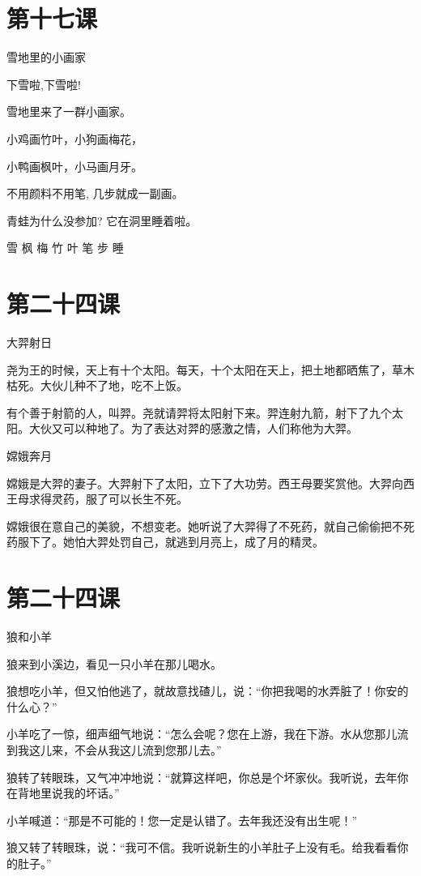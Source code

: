 \documentclass[12pt,UTF8]{ctexbook}
\begin{document}
\section{第十七课}

雪地里的小画家

下雪啦,下雪啦!

雪地里来了一群小画家。

小鸡画竹叶，小狗画梅花，

小鸭画枫叶，小马画月牙。

不用颜料不用笔, 几步就成一副画。

青蛙为什么没参加? 它在洞里睡着啦。

雪 枫 梅 竹 叶 笔 步 睡

\section{第二十四课}

大羿射日

尧为王的时候，天上有十个太阳。每天，十个太阳在天上，把土地都晒焦了，草木枯死。大伙儿种不了地，吃不上饭。

有个善于射箭的人，叫羿。尧就请羿将太阳射下来。羿连射九箭，射下了九个太阳。大伙又可以种地了。为了表达对羿的感激之情，人们称他为大羿。

嫦娥奔月

嫦娥是大羿的妻子。大羿射下了太阳，立下了大功劳。西王母要奖赏他。大羿向西王母求得灵药，服了可以长生不死。

嫦娥很在意自己的美貌，不想变老。她听说了大羿得了不死药，就自己偷偷把不死药服下了。她怕大羿处罚自己，就逃到月亮上，成了月的精灵。

\section{第二十四课}

狼和小羊

狼来到小溪边，看见一只小羊在那儿喝水。

狼想吃小羊，但又怕他逃了，就故意找碴儿，说：“你把我喝的水弄脏了！你安的什么心？”

小羊吃了一惊，细声细气地说：“怎么会呢？您在上游，我在下游。水从您那儿流到我这儿来，不会从我这儿流到您那儿去。”

狼转了转眼珠，又气冲冲地说：“就算这样吧，你总是个坏家伙。我听说，去年你在背地里说我的坏话。”

小羊喊道：“那是不可能的！您一定是认错了。去年我还没有出生呢！”

狼又转了转眼珠，说：“我可不信。我听说新生的小羊肚子上没有毛。给我看看你的肚子。”
\end{document}
